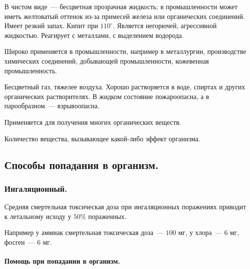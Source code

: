 \documentclass[12pt]{article}
\begin{document}
	\begin{definition}
		В чистом виде~--- бесцветная прозрачная жидкость; в промышленности может иметь желтоватый оттенок из-за примесей железа или органических соединений. Имеет резкий запах. Кипит при $110^{\circ}$. Является негорючей, агрессивной жидкостью. Реагирует с металлами, с выделением водорода.
		
		Широко применяется в промышленности, например в металлургии, производстве химических соединений, добывающей промышленности, кожевенная промышленность.
	\end{definition}
	
	\begin{definition}
		Бесцветный газ, тяжелее воздуха. Хорошо растворяется в воде, спиртах и других органических растворителях. В жидком состояние пожароопасна, а в парообразном~--- взрывоопасна.
		
		Применяется для получения многих органических веществ.
	\end{definition}
	
	\begin{definition}
		Количество вещества, вызывающее какой-либо эффект организма.
	\end{definition}
	
	\subsection{Способы попадания в организм.}
	
	\subsubsection{Ингаляционный.}
	
	Средняя смертельная токсическая доза при ингаляционных поражениях приводит к летальному исходу у $50\%$ пораженных.
	
	Например у аммиак смертельная токсическая доза~--- $100$ мг, у хлора~--- $6$ мг, фосген~--- $6$ мг.
	
	\paragraph{Помощь при попадании в организм.}
	
\end{document}
